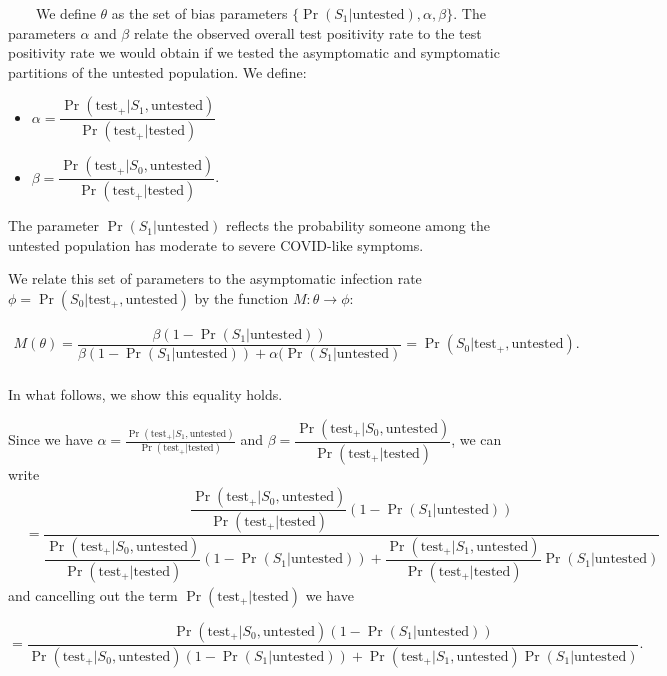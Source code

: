\documentclass[12pt,twoside]{smiththesis}
\providecommand{\tightlist}{%
  \setlength{\itemsep}{0pt}\setlength{\parskip}{0pt}}
\begin{document}
~~~~We define \(\theta\) as the set of bias parameters \(\{\Pr(S_1|\text{untested}), \alpha, \beta \}\). The parameters \(\alpha\) and \(\beta\) relate the observed overall test positivity rate to the test positivity rate we would obtain if we tested the asymptomatic and symptomatic partitions of the untested population. We define:
\begin{itemize}
\tightlist
\item
  \(\alpha = \dfrac{\Pr(\text{test}_+|S_1,\text{untested})}{\Pr(\text{test}_+|\text{tested})}\)
\item
  \(\beta = \dfrac{\Pr(\text{test}_+|S_0,\text{untested})}{\Pr(\text{test}_+|\text{tested})}\).
\end{itemize}
The parameter \(\Pr(S_1|\text{untested})\) reflects the probability someone among the untested population has moderate to severe COVID-like symptoms.

We relate this set of parameters to the asymptomatic infection rate \(\phi = \Pr(S_0|\text{test}_+, \text{untested})\) by the function \(M: \theta \to \phi\):
\begin{tcolorbox}
\vspace{2 mm}
\begin{align*}   
 M(\theta)  = \dfrac{\beta (1- \Pr(S_1|\text{untested}))}{\beta(1- \Pr(S_1|\text{untested})) + \alpha(\Pr(S_1|\text{untested})} = \Pr(S_0|\text{test}_+, \text{untested}).\\
\end{align*}
\end{tcolorbox}
\noindent In what follows, we show this equality holds.

\noindent Since we have \(\alpha = \frac{\Pr(\text{test}_+|S_1, \text{untested})}{\Pr(\text{test}_+|\text{tested})}\) and \(\beta = \dfrac{\Pr(\text{test}_+|S_0, \text{untested})}{\Pr(\text{test}_+|\text{tested})}\), we can write
\begin{align*}  &= \dfrac{\dfrac{\Pr(\text{test}_+|S_0, \text{untested})}{\Pr(\text{test}_+|\text{tested})}(1 - \Pr(S_1|\text{untested}))}{\dfrac{\Pr(\text{test}_+|S_0, \text{untested})}{\Pr(\text{test}_+|\text{tested})}(1-\Pr(S_1|\text{untested})) + \dfrac{\Pr(\text{test}_+|S_1, \text{untested})}{\Pr(\text{test}_+|\text{tested})} \Pr(S_1|\text{untested})}
\end{align*}
and cancelling out the term \(\Pr(\text{test}_+|\text{tested})\) we have

\[ = \dfrac{{\Pr(\text{test}_+|S_0, \text{untested})}(1 - \Pr(S_1|\text{untested}))}{\Pr(\text{test}_+|S_0, \text{untested})(1-\Pr(S_1|\text{untested})) + \Pr(\text{test}_+|S_1, \text{untested}) \Pr(S_1|\text{untested})}.\]
\end{document}

